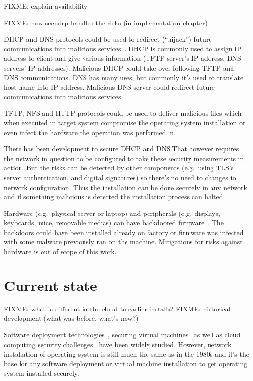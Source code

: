 FIXME: explain availability

FIXME: how secudep handles the risks (in implementation chapter)

DHCP and DNS protocols could be used to redirect (``hijack'') future
communications into malicious
services~\cite{green2005dns}\cite{ornaghi2003man}. DHCP is commonly
used to assign IP address to client and give various information (TFTP
server's IP address, DNS servers' IP addresses). Malicious DHCP could
take over following TFTP and DNS communications. DNS has many uses,
but commonly it's used to translate host name into IP
address. Malicious DNS server could redirect future communications
into malicious services.

TFTP, NFS and HTTP protocols could be used to deliver malicious files
which when executed in target system compromise the operating system
installation or even infect the hardware the operation was performed
in.

There has been development to secure DHCP and DNS.\@ That however
requires the network in question to be configured to take these
security measurements in action. But the risks can be detected by
other components (e.g.\ using TLS's server authentication, and digital
signatures) so there's no need to changes to network
configuration. Thus the installation can be done securely in any
network and if something malicious is detected the installation
process can halted.

Hardware (e.g.\ physical server or laptop) and peripherals (e.g.\
displays, keyboards, mice, removable medias) can have backdoored
firmware~\cite{swierczynski2016interdiction}. The backdoors could have
been installed already on factory or firmware was infected with some
malware previously ran on the machine. Mitigations for risks against
hardware is out of scope of this work.


\section{Current state}

FIXME: what is different in the cloud to earlier installs?
FIXME: historical development (what was before, what's now?)

Software deployment technologies~\cite{SoftDep}, securing virtual
machines~\cite{Garfinkel2005} as well as cloud computing security
challenges~\cite{Owens2010}\cite{Hashizume2013} have been widely
studied. However, network installation of operating system is still
much the same as in the 1980s and it's the base for any software
deployment or virtual machine installation to get operating system
installed securely.

